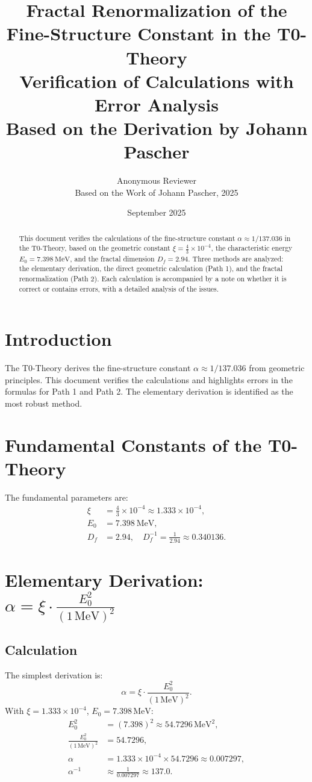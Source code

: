 \documentclass[12pt,a4paper]{article}
\title{\textbf{Fractal Renormalization of the Fine-Structure Constant in the T0-Theory}\\[0.5cm]
	\large Verification of Calculations with Error Analysis\\[0.3cm]
	\normalsize Based on the Derivation by Johann Pascher}
\author{Anonymous Reviewer\\
	\small Based on the Work of Johann Pascher, 2025}
\date{September 2025}
\theoremstyle{definition}
\begin{document}
	
	\maketitle
	
	\begin{abstract}
		This document verifies the calculations of the fine-structure constant \(\alpha \approx 1/137.036\) in the T0-Theory, based on the geometric constant \(\xi = \frac{4}{3} \times 10^{-4}\), the characteristic energy \(E_0 = \SI{7.398}{\MeV}\), and the fractal dimension \(D_f = 2.94\). Three methods are analyzed: the elementary derivation, the direct geometric calculation (Path 1), and the fractal renormalization (Path 2). Each calculation is accompanied by a note on whether it is correct or contains errors, with a detailed analysis of the issues.
	\end{abstract}
	
	\tableofcontents
	\newpage
	
	\section{Introduction}
	The T0-Theory derives the fine-structure constant \(\alpha \approx 1/137.036\) from geometric principles. This document verifies the calculations and highlights errors in the formulas for Path 1 and Path 2. The elementary derivation is identified as the most robust method.
	
	\section{Fundamental Constants of the T0-Theory}
	The fundamental parameters are:
	\begin{align}
		\xi &= \frac{4}{3} \times 10^{-4} \approx 1.333 \times 10^{-4}, \\
		E_0 &= \SI{7.398}{\MeV}, \\
		D_f &= 2.94, \quad D_f^{-1} = \frac{1}{2.94} \approx 0.340136.
	\end{align}
	
	\section{Elementary Derivation: \(\alpha = \xi \cdot \frac{E_0^2}{(1 \, \text{MeV})^2}\)}
	\subsection{Calculation}
	The simplest derivation is:
	\begin{equation}
		\alpha = \xi \cdot \frac{E_0^2}{(1 \, \text{MeV})^2}.
	\end{equation}
	With \(\xi = 1.333 \times 10^{-4}\), \(E_0 = 7.398 \, \text{MeV}\):
	\begin{align}
		E_0^2 &= (7.398)^2 \approx 54.7296 \, \text{MeV}^2, \\
		\frac{E_0^2}{(1 \, \text{MeV})^2} &= 54.7296, \\
		\alpha &= 1.333 \times 10^{-4} \times 54.7296 \approx 0.007297, \\
		\alpha^{-1} &\approx \frac{1}{0.007297} \approx 137.0.
	\end{align}
	
\end{document}
